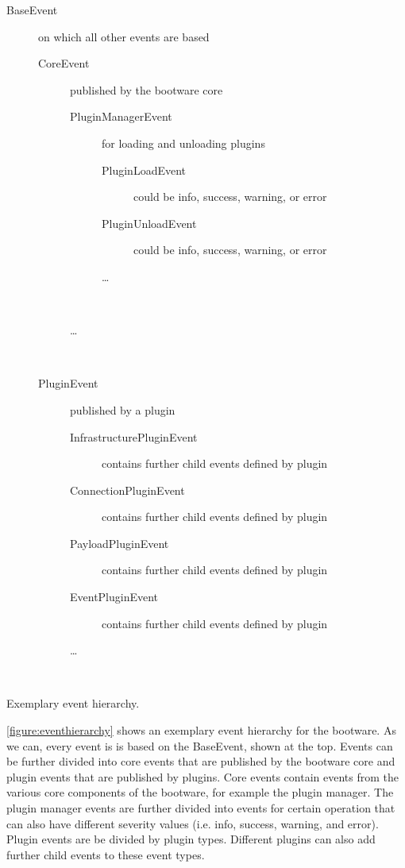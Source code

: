 \vspace*{\baselineskip}
\begingroup
	\centering
	\captionsetup{type=figure}
	\begin{description}
		\item[BaseEvent] on which all other events are based
		\begin{description}
			\item[CoreEvent] published by the bootware core
			\begin{description}
				\item[PluginManagerEvent] for loading and unloading plugins
				\begin{description}
					\item[PluginLoadEvent] could be info, success, warning, or error
					\item[PluginUnloadEvent] could be info, success, warning, or error
					\item[\ldots] ~
				\end{description}
				\item[\ldots] ~
			\end{description}
		\end{description}
		\begin{description}
			\item[PluginEvent] published by a plugin
			\begin{description}
				\item[InfrastructurePluginEvent] contains further child events defined by plugin
				\item[ConnectionPluginEvent] contains further child events defined by plugin
				\item[PayloadPluginEvent] contains further child events defined by plugin
				\item[EventPluginEvent] contains further child events defined by plugin
				\item[\ldots] ~
			\end{description}
		\end{description}
	\end{description}
	\caption{Exemplary event hierarchy.}
	\label{figure:eventhierarchy}
\endgroup

\autoref{figure:eventhierarchy} shows an exemplary event hierarchy for the bootware.
As we can, every event is is based on the BaseEvent, shown at the top.
Events can be further divided into core events that are published by the bootware core and plugin events that are published by plugins.
Core events contain events from the various core components of the bootware, for example the plugin manager.
The plugin manager events are further divided into events for certain operation that can also have different severity values (i.e. info, success, warning, and error).
Plugin events are be divided by plugin types.
Different plugins can also add further child events to these event types.
